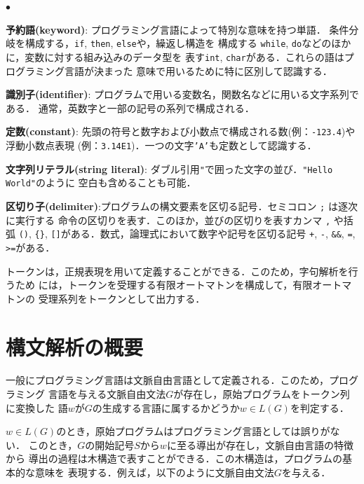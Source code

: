 \documentclass[dvipdfmx,a4j]{jbook}
\begin{document}
\begin{list}{$\bullet$}{\setlength{\leftmargin}{10pt}}
  \item {\bf 予約語(keyword)}: プログラミング言語によって特別な意味を持つ単語．
  条件分岐を構成する，\texttt{if}, \texttt{then}, \texttt{else}や，繰返し構造を
  構成する \texttt{while}, \texttt{do}などのほかに，変数に対する組み込みのデータ型を
  表す\texttt{int}, \texttt{char}がある．これらの語はプログラミング言語が決まった
  意味で用いるために特に区別して認識する．
  \item {\bf 識別子(identifier)}: プログラムで用いる変数名，関数名などに用いる文字系列である．
  通常，英数字と一部の記号の系列で構成される．
  \item {\bf 定数(constant)}: 先頭の符号と数字および小数点で構成される数(例：\texttt{-123.4})や浮動小数点表現
  (例：\texttt{3.14E1})．一つの文字\texttt{'A'}も定数として認識する． 
  \item {\bf 文字列リテラル(string literal)}: ダブル引用\texttt{"}で囲った文字の並び．\texttt{"Hello World"}のように
  空白も含めることも可能．
  \item {\bf 区切り子(delimiter)}:プログラムの構文要素を区切る記号．セミコロン \texttt{;} は逐次に実行する
  命令の区切りを表す．このほか，並びの区切りを表すカンマ \texttt{,} や括弧 \texttt{()},
  \texttt{\{\}}, \texttt{[]}がある．数式，論理式において数字や記号を区切る記号 
  \texttt{+}, \texttt{-}, \texttt{\&\&}, \texttt{=}, \texttt{>=}がある．
\end{list}

トークンは，正規表現を用いて定義することができる．このため，字句解析を行うため
には，トークンを受理する有限オートマトンを構成して，有限オートマトンの
受理系列をトークンとして出力する．

\section{構文解析の概要}

一般にプログラミング言語は文脈自由言語として定義される．このため，プログラミング
言語を与える文脈自由文法$G$が存在し，原始プログラムをトークン列に変換した
語$w$が$G$の生成する言語に属するかどうか$w\in L(G)$を判定する．

$w\in L(G)$のとき，原始プログラムはプログラミング言語としては誤りがない．
このとき，$G$の開始記号$S$から$w$に至る導出が存在し，文脈自由言語の特徴から
導出の過程は木構造で表すことができる．この木構造は，プログラムの基本的な意味を
表現する．例えば，以下のように文脈自由文法$G$を与える．
\end{document}

